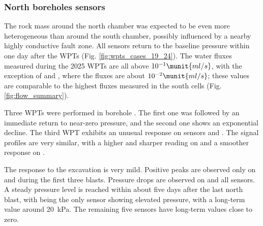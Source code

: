\subsubsection{North boreholes sensors}

The rock mass around the north chamber was expected to be even more heterogeneous
than around the south chamber, possibly influenced by a nearby highly conductive
fault zone. All sensors return to the baseline pressure within one day after the
WPTs (Fig. \ref{fig:wpts_cases_19_24}). The water fluxes measured during the
2025 WPTs are all above $10^{-1} \munit{ml/s}$, with the exception of  and
, where the fluxes are about $10^{-2} \munit{ml/s}$; these values are
comparable to the highest fluxes measured in the south cells
(Fig. \ref{fig:flow_summary}).

Three WPTs were performed in borehole . The first one was followed by
an immediate return to near-zero pressure, and the second one shows an exponential
decline. The third WPT exhibits an unusual response on sensors  and
. The signal profiles are very similar, with a higher and sharper
reading on  and a smoother response on .

The response to the excavation is very mild. Positive peaks are observed only on
 and  during the first three blasts. Pressure drops are observed on 
 and all  sensors.
A steady pressure level is reached within about five days after the last north blast, with
 being the only sensor showing elevated pressure, with a long-term
value around 20~kPa. The remaining five sensors have long-term values close to
zero.

